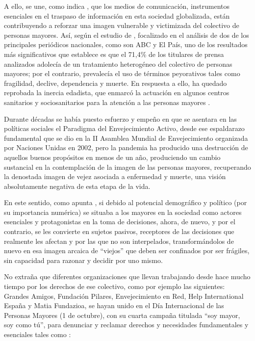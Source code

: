 \documentclass[spanish]{textolivre}
\begin{document}
A ello, se une, como indica \textcite{pinazo2020}, %
que los medios de comunicación, instrumentos esenciales en el traspaso de información en esta sociedad globalizada, están contribuyendo a reforzar una imagen vulnerable y victimizada del colectivo de personas mayores. Así, según el estudio de \textcite{bravovillar2020}, %
focalizado en el análisis de dos de los principales periódicos nacionales, como son ABC y El País, uno de los resultados más significativos que establece es que el 71,4\% de los titulares de prensa analizados adolecía de un tratamiento heterogéneo del colectivo de personas mayores; por el contrario, prevalecía el uso de términos peyorativos tales como fragilidad, declive, dependencia y muerte. En respuesta a ello, ha quedado reprobada la inercia edadista, que enmarcó la actuación en algunos centros sanitarios y sociosanitarios para la atención a las personas mayores \cite{tarazona2020}. %

Durante décadas se había puesto esfuerzo y empeño en que se asentara en las políticas sociales el Paradigma del Envejecimiento Activo, desde ese espaldarazo fundamental que se dio en la II Asamblea Mundial de Envejecimiento organizada por Naciones Unidas en 2002, pero la pandemia ha producido una destrucción de aquellos buenos propósitos en menos de un año, produciendo un cambio sustancial en la contemplación de la imagen de las personas mayores, recuperando la denostada imagen de vejez asociada a enfermedad y muerte, una visión absolutamente negativa de esta etapa de la vida.

En este sentido, como apunta \textcite{klein2020}, %
si debido al potencial demográfico y político (por su importancia numérica) se situaba a los mayores en la sociedad como actores esenciales y protagonistas en la toma de decisiones, ahora, de nuevo, y por el contrario, se les convierte en sujetos pasivos, receptores de las decisiones que realmente les afectan y por las que no son interpelados, transformándolos de nuevo en esa imagen arcaica de “viejos” que deben ser confinados por ser frágiles, sin capacidad para razonar y decidir por uno mismo.

No extraña que diferentes organizaciones que llevan trabajando desde hace mucho tiempo por los derechos de ese colectivo, como por ejemplo las siguientes: Grandes Amigos, Fundación Pilares, Envejecimiento en Red, Help International España y Matia Fundazioa, se hayan unido en el Día Internacional de las Personas Mayores (1 de octubre), con  su cuarta campaña titulada “soy mayor, soy como tú”, para denunciar y reclamar derechos y necesidades fundamentales y esenciales tales como \cite{helpage2020a}: %
\end{document}
